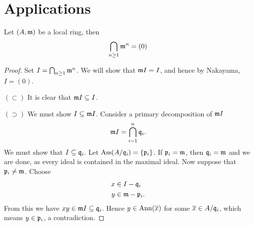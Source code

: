 \documentclass{ximera}
\begin{document}
\section{Applications}

\begin{corollary}
  Let $(A,\mathfrak{m})$ be a local ring, then
  \[
  \bigcap_{n\ge 1} \mathfrak{m}^n  = (0)
  \]
  \begin{proof}
    Set $I = \bigcap_{n\ge 1} \mathfrak{m}^n$. We will show that $\mathfrak{m} I = I$, and
    hence by Nakayama, $I = (0)$.

    $(\subset)$ It is clear that $\mathfrak{m} I \subseteq I$.

    $(\supset)$ We must show $I\subseteq \mathfrak{m} I$. Consider a primary
    decomposition of $\mathfrak{m} I$
    \[
    \mathfrak{m} I = \bigcap_{i=1}^n \mathfrak{q}_i.
    \]
    We must show that $I\subseteq\mathfrak{q}_i$.  Let $\operatorname{Ass}(A/\mathfrak{q}_i) =
    \{\mathfrak{p}_i\}$. If $\mathfrak{p}_i = \mathfrak{m}$, then $\mathfrak{q}_i=\mathfrak{m}$ and we are done, as
    every ideal is contained in the maximal ideal. Now suppose that
    $\mathfrak{p}_i\ne\mathfrak{m}$. Choose
    \begin{align*}
      x &\in I -\mathfrak{q}_i\\
      y &\in \mathfrak{m} - \mathfrak{p}_i.
    \end{align*}
    From this we have $xy\in\mathfrak{m} I \subseteq \mathfrak{q}_i$. Hence $y\in\operatorname{Ann}(\overline{x})$
    for some $\overline{x}\in A/\mathfrak{q}_i$, which means $y\in \mathfrak{p}_i$, a contradiction.
  \end{proof}
\end{corollary}
\end{document}
